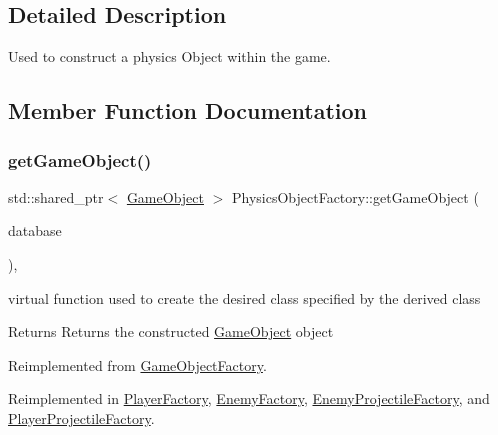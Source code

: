 \subsection{Detailed Description}
Used to construct a physics Object within the game. 

\subsection{Member Function Documentation}
\mbox{\label{class_physics_object_factory_a2644107d0c455c3307559cd824a7c9a8}} 
\subsubsection{\texorpdfstring{get\+Game\+Object()}{getGameObject()}}
{\footnotesize\ttfamily std\+::shared\+\_\+ptr$<$ \hyperlink{class_game_object}{Game\+Object} $>$ Physics\+Object\+Factory\+::get\+Game\+Object (\begin{DoxyParamCaption}\item[{const std\+::shared\+\_\+ptr$<$ \hyperlink{class_database_interface}{Database\+Interface} $>$ \&}]{database }\end{DoxyParamCaption})\hspace{0.3cm}{\ttfamily [override]}, {\ttfamily [virtual]}}



virtual function used to create the desired class specified by the derived class 

\begin{DoxyReturn}{Returns}
Returns the constructed \hyperlink{class_game_object}{Game\+Object} object 
\end{DoxyReturn}


Reimplemented from \hyperlink{class_game_object_factory_a5b684a6e77fb82c041f1721eb07c553d}{Game\+Object\+Factory}.



Reimplemented in \hyperlink{class_player_factory_ab92534e7d2d6887ecf9e4ed8131a8112}{Player\+Factory}, \hyperlink{class_enemy_factory_acb6ad18d5ef69a27927907fa9a444c7d}{Enemy\+Factory}, \hyperlink{class_enemy_projectile_factory_a081c6bea7032956c278fdf4ff62d530a}{Enemy\+Projectile\+Factory}, and \hyperlink{class_player_projectile_factory_a804a9f591ce6f0a7fb04f35ff685ff57}{Player\+Projectile\+Factory}.

